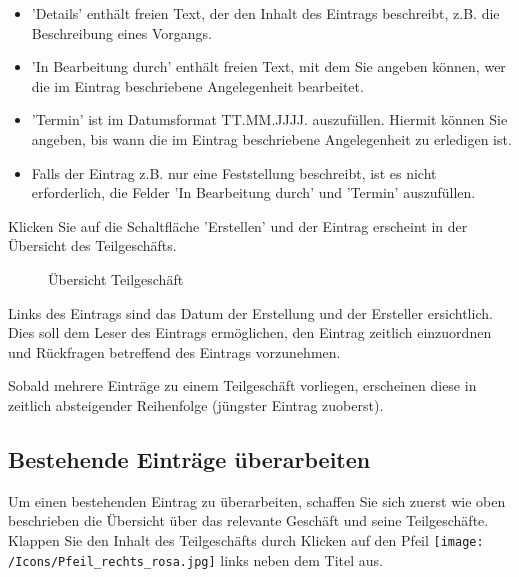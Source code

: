 \begin{itemize}
\item
'Details'  enthält freien Text, der den Inhalt
des Eintrags beschreibt, z.B. die Beschreibung eines Vorgangs.
\item
'In Bearbeitung durch'  enthält freien Text, mit dem Sie angeben können, wer die im Eintrag beschriebene Angelegenheit bearbeitet.
\item
'Termin'  ist im Datumsformat TT.MM.JJJJ. auszufüllen. Hiermit können Sie angeben, bis wann die im Eintrag beschriebene Angelegenheit zu erledigen ist.
\item
Falls der Eintrag z.B. nur eine Feststellung beschreibt, ist es nicht erforderlich, die Felder 'In Bearbeitung durch' und 'Termin' auszufüllen.
\end{itemize}

Klicken Sie auf die Schaltfläche 'Erstellen'  und der Eintrag erscheint in der Übersicht des Teilgeschäfts.

\begin{figure}[H]
\caption{Übersicht Teilgeschäft}
\end{figure}

Links des Eintrags sind das Datum der Erstellung und der Ersteller  ersichtlich. Dies soll dem Leser des Eintrags ermöglichen, den Eintrag zeitlich einzuordnen und Rückfragen betreffend des Eintrags vorzunehmen.

Sobald mehrere Einträge zu einem Teilgeschäft vorliegen, erscheinen diese in zeitlich absteigender Reihenfolge (jüngster Eintrag zuoberst).

\subsection{Bestehende Einträge überarbeiten}

Um einen bestehenden Eintrag zu überarbeiten, schaffen Sie sich zuerst wie oben beschrieben die Übersicht über das relevante Geschäft und seine Teilgeschäfte. Klappen Sie den Inhalt des Teilgeschäfts durch Klicken auf den Pfeil \texttt{[image: /Icons/Pfeil\_rechts\_rosa.jpg]} links neben dem Titel aus.
	
